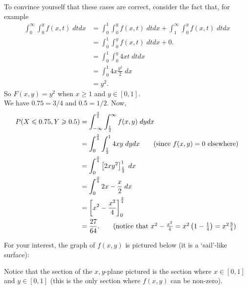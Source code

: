 To convince yourself that these cases are correct, consider the fact that, for example 
\begin{align*}
\int_0^\infty \int_0^y f(x,t) \; dtdx & = \int_0^1 \int_0^y f(x,t) \; dtdx + \int_1^\infty \int_0^y f(x,t) \; dtdx \\
& = \int_0^1 \int_0^y f(x,t) \; dtdx + 0. \tag{since $f(x,y) = 0$ when $x \geq 1$} \\
& = \int_0^1 \int_0^y 4xt \; dtdx \tag{since $k = 4$ by part (1)} \\
& = \int_0^1 4x\frac{y^2}{2} \; dx \\
& = y^2.
\end{align*}
So $F(x,y) = y^2$ when $x \geq 1$ and $y \in [0,1]$. \\

\solution[to (3)]
We have $0.75 = 3/4$ and $0.5 = 1/2$. Now,
\begin{align*}
P(X \leq 0.75, Y \geq 0.5) & = \int_{-\infty}^{\frac{3}{4}} \int_{\frac{1}{2}}^{\infty} f(x,y) \; dy dx \\
	& = \int_{0}^{\frac{3}{4}} \int_{\frac{1}{2}}^{1} 4xy \; dydx \tag{since $f(x,y) = 0$ elsewhere} \\
	& = \int_{0}^{\frac{3}{4}} \squac{2xy^2}_{\frac{1}{2}}^1 \; dx \\
	& = \int_{0}^{\frac{3}{4}} 2x - \frac{x}{2} \; dx \\
	& = \squac{x^2 - \frac{x^2}{4}}_0^{\frac{3}{4}} \\
	& = \frac{27}{64}. \tag{notice that $x^2 - \frac{x^2}{4} = x^2\brac{1-\frac{1}{4}} = x^2\frac{3}{4}$}
\end{align*}

\noindent For your interest, the graph of $f(x,y)$ is pictured below (it is a `sail'-like surface):
\begin{center}
\end{center}

\noindent Notice that the section of the $x,y$-plane pictured is the section where $x \in [0,1]$ and $y \in [0,1]$ (this is the only section where $f(x,y)$ can be non-zero).

